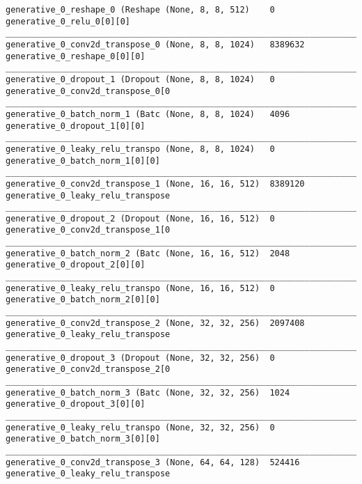 \begin{lstlisting}[caption={CelebA-VLAE Decoder},captionpos=b,basicstyle=\tiny, label={lst:celeba-vlae-decoder}]
generative_0_reshape_0 (Reshape (None, 8, 8, 512)    0           generative_0_relu_0[0][0]
__________________________________________________________________________________________________
generative_0_conv2d_transpose_0 (None, 8, 8, 1024)   8389632     generative_0_reshape_0[0][0]
__________________________________________________________________________________________________
generative_0_dropout_1 (Dropout (None, 8, 8, 1024)   0           generative_0_conv2d_transpose_0[0
__________________________________________________________________________________________________
generative_0_batch_norm_1 (Batc (None, 8, 8, 1024)   4096        generative_0_dropout_1[0][0]
__________________________________________________________________________________________________
generative_0_leaky_relu_transpo (None, 8, 8, 1024)   0           generative_0_batch_norm_1[0][0]
__________________________________________________________________________________________________
generative_0_conv2d_transpose_1 (None, 16, 16, 512)  8389120     generative_0_leaky_relu_transpose
__________________________________________________________________________________________________
generative_0_dropout_2 (Dropout (None, 16, 16, 512)  0           generative_0_conv2d_transpose_1[0
__________________________________________________________________________________________________
generative_0_batch_norm_2 (Batc (None, 16, 16, 512)  2048        generative_0_dropout_2[0][0]
__________________________________________________________________________________________________
generative_0_leaky_relu_transpo (None, 16, 16, 512)  0           generative_0_batch_norm_2[0][0]
__________________________________________________________________________________________________
generative_0_conv2d_transpose_2 (None, 32, 32, 256)  2097408     generative_0_leaky_relu_transpose
__________________________________________________________________________________________________
generative_0_dropout_3 (Dropout (None, 32, 32, 256)  0           generative_0_conv2d_transpose_2[0
__________________________________________________________________________________________________
generative_0_batch_norm_3 (Batc (None, 32, 32, 256)  1024        generative_0_dropout_3[0][0]
__________________________________________________________________________________________________
generative_0_leaky_relu_transpo (None, 32, 32, 256)  0           generative_0_batch_norm_3[0][0]
__________________________________________________________________________________________________
generative_0_conv2d_transpose_3 (None, 64, 64, 128)  524416      generative_0_leaky_relu_transpose

\end{lstlisting}
